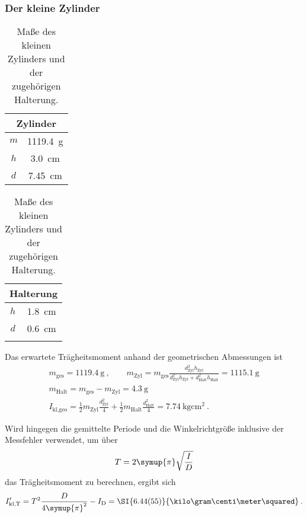 \FloatBarrier
\subsubsection{Der kleine Zylinder}

\begin{table}
    \centering
    \caption{Maße des kleinen Zylinders und der zugehörigen Halterung.}
    \label{tab:kleZyl}
    \begin{tabular}{c c}
        \toprule
        \multicolumn{2}{c}{Zylinder} \\
        \midrule
        $m$ & \SI{1119.4}{\gram} \\
        $h$ & \SI{3.0}{\centi\meter} \\
        $d$ & \SI{7.45}{\centi\meter} \\
        \bottomrule
    \end{tabular}
    \qquad \qquad 
    \begin{tabular}{c c}
        \toprule
        \multicolumn{2}{c}{Halterung}\\
        \midrule
        $h$ & \SI{1.8}{\centi\meter} \\
        $d$ & \SI{0.6}{\centi\meter} \\
        \bottomrule
            \\
    \end{tabular}
\end{table}

Das erwartete Trägheitsmoment anhand der geometrischen Abmessungen ist 
\begin{gather}
    m_\text{ges}=\SI{1119.4}{\gram}\:, \qquad 
    m_\text{Zyl}=m_\text{ges}\frac{d_\text{Zyl}^2h_\text{Zyl}}{d_\text{Zyl}^2h_\text{Zyl}+d_\text{Halt}^2h_\text{Halt}}=\SI{1115.1}{\gram} \\
    m_\text{Halt} = m_\text{ges}-m_\text{Zyl}=\SI{4.3}{\gram} \\
    I_\text{kl,geo}=\frac{1}{2}m_\text{Zyl}\frac{d_\text{Zyl}^2}{4}+\frac{1}{2}m_\text{Halt}\frac{d_\text{Halt}^2}{4}=\SI{7.74}{\kilo\gram\centi\meter\squared}\:.
\end{gather}

Wird hingegen die gemittelte Periode und die Winkelrichtgröße inklusive der Messfehler verwendet, um über 
\begin{equation}
    T=2\symup{\pi}\sqrt{\frac{I}{D}}
\end{equation}
das Trägheitsmoment zu berechnen, ergibt sich 
\begin{equation}
    I'_\text{kl,T}=T^2\frac{D}{4\symup{\pi}^2}-I_\text{D}=\SI{6.44(55)}{\kilo\gram\centi\meter\squared}\:.
\end{equation}

